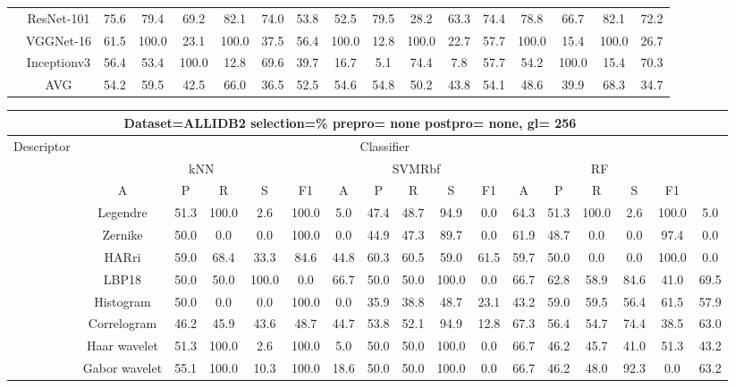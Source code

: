 \documentclass[12pt,italian]{article}
\begin{document}
\begin{tiny}
\begin{longtable}{lcccccccccccccccc}
& ResNet-101 & 75.6 & 79.4 & 69.2 & 82.1 & 74.0 & 53.8 & 52.5 & 79.5 & 28.2 & 63.3 & 74.4 & 78.8 & 66.7 & 82.1 & 72.2 \\ 
& VGGNet-16 & 61.5 & 100.0 & 23.1 & 100.0 & 37.5 & 56.4 & 100.0 & 12.8 & 100.0 & 22.7 & 57.7 & 100.0 & 15.4 & 100.0 & 26.7 \\ 
& Inceptionv3 & 56.4 & 53.4 & 100.0 & 12.8 & 69.6 & 39.7 & 16.7 &  5.1 & 74.4 &  7.8 & 57.7 & 54.2 & 100.0 & 15.4 & 70.3 \\ 
\hline
& AVG & 54.2 & 59.5 & 42.5 & 66.0 & 36.5 & 52.5 & 54.6 & 54.8 & 50.2 & 43.8 & 54.1 & 48.6 & 39.9 & 68.3 & 34.7 \\ 
\hline
\bottomrule
\end{longtable} 

 \pagebreak 
\begin{longtable}{lcccccccccccccccc}
\toprule
\multicolumn{16}{c}{Dataset=ALLIDB2 selection=\% prepro= none postpro= none, gl= 256} \\ 
\toprule
Descriptor & \multicolumn{15}{c}{Classifier} \\ 
& \multicolumn{5}{c}{kNN} & \multicolumn{5}{c}{SVMRbf} & \multicolumn{5}{c}{RF} \\ 
& A & P & R & S & F1 & A & P & R & S & F1 & A & P & R & S & F1 \\ 
\midrule
& Legendre & 51.3 & 100.0 &  2.6 & 100.0 &  5.0 & 47.4 & 48.7 & 94.9 &  0.0 & 64.3 & 51.3 & 100.0 &  2.6 & 100.0 &  5.0 \\ 
& Zernike & 50.0 &  0.0 &  0.0 & 100.0 &  0.0 & 44.9 & 47.3 & 89.7 &  0.0 & 61.9 & 48.7 &  0.0 &  0.0 & 97.4 &  0.0 \\ 
& HARri & 59.0 & 68.4 & 33.3 & 84.6 & 44.8 & 60.3 & 60.5 & 59.0 & 61.5 & 59.7 & 50.0 &  0.0 &  0.0 & 100.0 &  0.0 \\ 
& LBP18 & 50.0 & 50.0 & 100.0 &  0.0 & 66.7 & 50.0 & 50.0 & 100.0 &  0.0 & 66.7 & 62.8 & 58.9 & 84.6 & 41.0 & 69.5 \\ 
& Histogram & 50.0 &  0.0 &  0.0 & 100.0 &  0.0 & 35.9 & 38.8 & 48.7 & 23.1 & 43.2 & 59.0 & 59.5 & 56.4 & 61.5 & 57.9 \\ 
& Correlogram & 46.2 & 45.9 & 43.6 & 48.7 & 44.7 & 53.8 & 52.1 & 94.9 & 12.8 & 67.3 & 56.4 & 54.7 & 74.4 & 38.5 & 63.0 \\ 
& Haar wavelet & 51.3 & 100.0 &  2.6 & 100.0 &  5.0 & 50.0 & 50.0 & 100.0 &  0.0 & 66.7 & 46.2 & 45.7 & 41.0 & 51.3 & 43.2 \\ 
& Gabor wavelet & 55.1 & 100.0 & 10.3 & 100.0 & 18.6 & 50.0 & 50.0 & 100.0 &  0.0 & 66.7 & 46.2 & 48.0 & 92.3 &  0.0 & 63.2 \\ 

\end{longtable}
\end{tiny}
\end{document}
